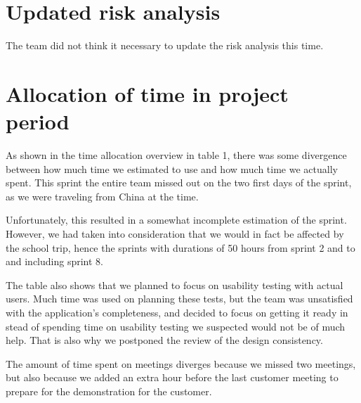\documentclass[12pt]{article}
\begin{document}
\section{Updated risk analysis}
The team did not think it necessary to update the risk analysis this time.


\section{Allocation of time in project period}
As shown in the time allocation overview in table 1, there was some divergence between how much time we estimated to use and how much time we actually spent. This sprint the entire team missed out on the two first days of the sprint, as we were traveling from China at the time. 

Unfortunately, this resulted in a somewhat incomplete estimation of the sprint. However, we had taken into consideration that we would in fact be affected by the school trip, hence the sprints with durations of 50 hours from sprint 2 and to and including sprint 8.

The table also shows that we planned to focus on usability testing with actual users. Much time was used on planning these tests, but the team was unsatisfied with the application's completeness, and decided to focus on getting it ready in stead of spending time on usability testing we suspected would not be of much help. That is also why we postponed the review of the design consistency.

The amount of time spent on meetings diverges because we missed two meetings, but also because we added an extra hour before the last customer meeting to prepare for the demonstration for the customer.
\end{document}
